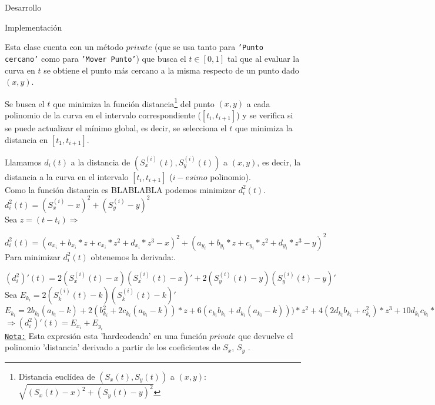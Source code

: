 \begin{section}{Desarrollo}
\begin{subsection}{Implementación}
\begin{itemize}
				Esta clase cuenta con un método $private$ (que se usa tanto para \texttt{'Punto cercano'} como para \texttt{'Mover Punto'}) que busca el $t \in [0,1]$ tal que al evaluar la curva en $t$ se obtiene el punto más cercano a la 
				misma respecto de un punto dado $(x,y)$.
				
				Se busca el $t$ que minimiza la función distancia\footnote{Distancia euclídea de $(S_x(t),S_y(t))$ a $(x,y)$: $\sqrt{(S_x(t)-x)^2+(S_y(t)-y)^2}$}
				del punto $(x,y)$ a cada polinomio de la curva en el intervalo correspondiente ($[t_i,t_{i+1}]$) y se verifica si se puede actualizar el mínimo 
				global, es decir, se selecciona el $t$ que minimiza la distancia en $[t_1,t_{i+1}]$.
				
				Llamamos $d_i(t)$ a la distancia de $(S_x^{(i)}(t),S_y^{(i)}(t))$ a $(x,y)$, es decir, la distancia a la curva en el intervalo $[t_i,t_{i+1}]$ 
				($i-esimo$ polinomio).\\
				
				Como la función distancia es BLABLABLA podemos minimizar $d_i^2(t)$.\\
				
				$d_i^2(t) = (S_x^{(i)}-x)^2+(S_y^{(i)}-y)^2$\\
				
				Sea $z=(t-t_i) \Rightarrow$
				
				$d_i^2(t) = (a_{x_i} + b_{x_i}*z + c_{x_i}*z^2 + d_{x_i}*z^3 - x)^2 + (a_{y_i} + b_{y_i}*z + c_{y_i}*z^2 + d_{y_i}*z^3 -y)^2$\\
				
				Para minimizar $d_i^2(t)$ obtenemos la derivada:.
				
				$(d_i^2)'(t) = 2(S_x^{(i)}(t)-x)(S_x^{(i)}(t)-x)'+2(S_y^{(i)}(t)-y)(S_y^{(i)}(t)-y)'$\\
				
				Sea $E_{k_i} = 2(S_k^{(i)}(t)-k)(S_k^{(i)}(t)-k)'$ \\
				
				$E_{k_i} = 2b_{k_i}(a_{k_i}-k)+2(b_{k_i}^2+2c_{k_i}(a_{k_i}-k))*z+6(c_{k_i}b_{k_i}+d_{k_i}(a_{k_i}-k)))*z^2+4(2d_{k_i}b_{k_i}+c_{k_i}^2)*z^3+10d_{k_i}c_{k_i}*z^4+6d_{k_i}^2*z^5$\\
				
				$\Rightarrow (d_i^2)'(t) = E_{x_i} + E_{y_i}$\\
				
				\underline{\texttt{Nota:}} Esta expresión esta 'hardcodeada' en una función $private$ que devuelve el polinomio 'distancia' derivado a partir
				de los coeficientes de $S_x$, $S_y$ .
				

\end{itemize}
\end{subsection}
\end{section}

